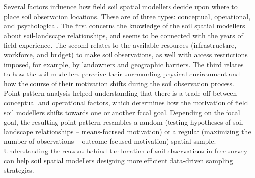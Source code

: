 Several factors influence how field soil spatial modellers decide upon where to place soil observation 
locations. These are of three types: conceptual, operational, and psychological. The first concerns the 
knowledge of the soil spatial modellers about soil-landscape relationships, and seems to be connected with the 
years of field experience. The second relates to the available resources (infrastructure, workforce, and 
budget) to make soil observations, as well with access restrictions imposed, for example, by landowners and 
geographic barriers. The third relates to how the soil modellers perceive their surrounding physical 
environment and how the course of their motivation shifts during the soil observation process. Point pattern 
analysis helped understanding that there is a trade-off between conceptual and operational factors, which 
determines how the motivation of field soil modellers shifts towards one or another focal goal. Depending on 
the focal goal, the resulting point pattern resembles a random (testing hypotheses of soil-landscape 
relationships -- means-focused motivation) or a regular (maximizing the number of observations -- 
outcome-focused motivation) spatial sample. Understanding the reasons behind the location of soil observations 
in free survey can help soil spatial modellers designing more efficient data-driven sampling strategies.


